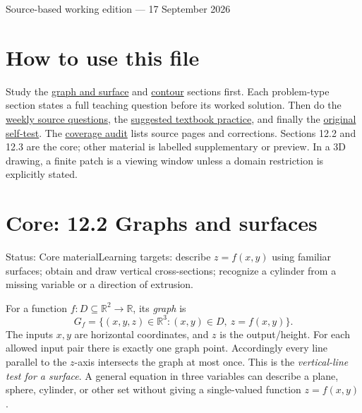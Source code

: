 \documentclass[11pt,letterpaper]{article}
\newcommand{\R}{\mathbb R}
\begin{document}
\hypersetup{pageanchor=false}
\begin{titlepage}\centering\vspace*{1.4in}{\Huge\bfseries MAT235 Week 2\\[12pt] Study Notes\par}\vspace{20pt}{\LARGE Section 12.2: Graphs and Surfaces\\Section 12.3: Contour Diagrams\par}\vspace{25pt}{\large Complete English notes, worked weekly questions, suggested 8th-edition textbook practice, and self-test\par}\vfill{\large Source-based working edition --- 17 September 2026\par}\end{titlepage}
\hypersetup{pageanchor=true}
\tableofcontents\clearpage{}
\section*{How to use this file}
Study the \hyperref[graph]{graph and surface} and \hyperref[contour]{contour} sections first. Each problem-type section states a full teaching question before its worked solution. Then do the \hyperref[weekly]{weekly source questions}, the \hyperref[textbook]{suggested textbook practice}, and finally the \hyperref[selftest]{original self-test}. The \hyperref[audit]{coverage audit} lists source pages and corrections. Sections 12.2 and 12.3 are the core; other material is labelled supplementary or preview. In a 3D drawing, a finite patch is a viewing window unless a domain restriction is explicitly stated.

\section{Core: 12.2 Graphs and surfaces}\label{graph}
\begin{statusbox}{Status: Core material}Learning targets: describe $z=f(x,y)$ using familiar surfaces; obtain and draw vertical cross-sections; recognize a cylinder from a missing variable or a direction of extrusion.\end{statusbox}
For a function $f:D\subseteq\R^2\to\R$, its \emph{graph} is
\[G_f=\{(x,y,z)\in\R^3:(x,y)\in D,\ z=f(x,y)\}.\]
The inputs $x,y$ are horizontal coordinates, and $z$ is the output/height. For each allowed input pair there is exactly one graph point. Accordingly every line parallel to the $z$-axis intersects the graph at most once. This is the \emph{vertical-line test for a surface}. A general equation in three variables can describe a plane, sphere, cylinder, or other set without giving a single-valued function $z=f(x,y)$.
\end{document}
